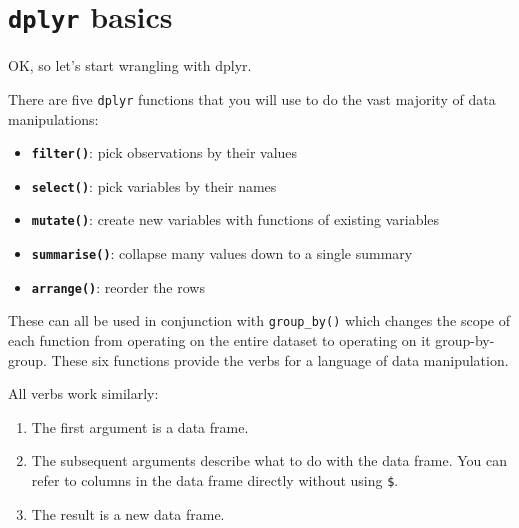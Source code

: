 \documentclass[]{book}
\providecommand{\tightlist}{%
  \setlength{\itemsep}{0pt}\setlength{\parskip}{0pt}}
\theoremstyle{definition}
\theoremstyle{definition}
\theoremstyle{definition}
\theoremstyle{remark}
\begin{document}
\section{\texorpdfstring{\texttt{dplyr}
basics}{dplyr basics}}\label{dplyr-basics}

OK, so let's start wrangling with dplyr.

There are five \texttt{dplyr} functions that you will use to do the vast
majority of data manipulations:

\begin{itemize}
\tightlist
\item
  \textbf{\texttt{filter()}}: pick observations by their values
\end{itemize}

\begin{itemize}
\tightlist
\item
  \textbf{\texttt{select()}}: pick variables by their names
\end{itemize}

\begin{itemize}
\tightlist
\item
  \textbf{\texttt{mutate()}}: create new variables with functions of
  existing variables
\end{itemize}

\begin{itemize}
\tightlist
\item
  \textbf{\texttt{summarise()}}: collapse many values down to a single
  summary
\end{itemize}

\begin{itemize}
\tightlist
\item
  \textbf{\texttt{arrange()}}: reorder the rows
\end{itemize}

These can all be used in conjunction with \texttt{group\_by()} which
changes the scope of each function from operating on the entire dataset
to operating on it group-by-group. These six functions provide the verbs
for a language of data manipulation.

All verbs work similarly:

\begin{enumerate}
\def\labelenumi{\arabic{enumi}.}
\tightlist
\item
  The first argument is a data frame.
\item
  The subsequent arguments describe what to do with the data frame. You
  can refer to columns in the data frame directly without using
  \texttt{\$}.
\item
  The result is a new data frame.
\end{enumerate}
\end{document}
